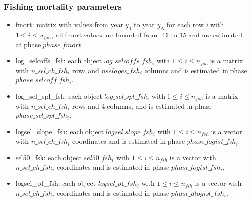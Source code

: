 \documentclass{article}
\begin{document}
\subsubsection{Fishing mortality parameters}
\begin{itemize}
    
    \item fmort: matrix with values from year $y_0$ to year $y_N$ for each row $i$ with $1\leq i \leq n_{fsh}$, all fmort values are bounded from -15 to 15 and are estimated at phase $phase\_fmort$.

    
    
    \item log\_selcoffs\_fsh: each object $log\_selcoffs\_fsh_i$ with $1\leq i \leq n_{fsh}$ is a matrix with $n\_sel\_ch\_fsh_i$ rows and $nselages\_fsh_i$ columns and is estimated in phase $phase\_selcoff\_fsh_i$.
    
    \item log\_sel\_spl\_fsh: each object $log\_sel\_spl\_fsh_i$ with $1\leq i \leq n_{fsh}$ is a matrix with $n\_sel\_ch\_fsh_i$ rows and 4 columns, and is estimated in phase $phase\_sel\_spl\_fsh_i$.
    

    
    \item logsel\_slope\_fsh: each object $logsel\_slope\_fsh_i$ with $1\leq i \leq n_{fsh}$ is a vector with $n\_sel\_ch\_fsh_i$ coordinates and is estimated in phase $phase\_logist\_fsh_i$.

    
    \item sel50\_fsh: each object $sel50\_fsh_i$ with $1\leq i\leq n_{fsh}$ is a vector with $n\_sel\_ch\_fsh_i$ coordinates and is estimated in phase $phase\_logist\_fsh_i$.

    
    \item logsel\_p1\_fsh: each object $logsel\_p1\_fsh_i$ with $1\leq i \leq n_{fsh}$ is a vector with $n\_sel\_ch\_fsh_i$ coordinates and is estimated in phase $phase\_dlogist\_fsh_i$.   



\end{itemize}
\end{document}
